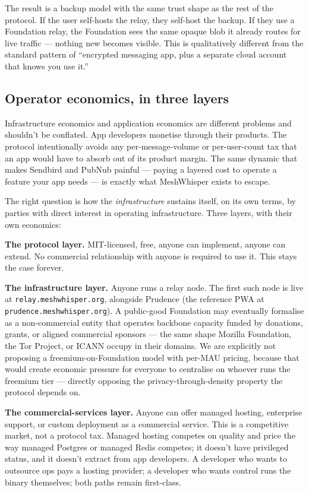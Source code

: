 \documentclass[11pt, a4paper]{article}
\begin{document}
The result is a backup model with the same trust shape as the rest of the protocol. If the user self-hosts the relay, they self-host the backup. If they use a Foundation relay, the Foundation sees the same opaque blob it already routes for live traffic — nothing new becomes visible. This is qualitatively different from the standard pattern of ``encrypted messaging app, plus a separate cloud account that knows you use it.''

\subsection*{Operator economics, in three layers}

Infrastructure economics and application economics are different problems and shouldn't be conflated. App developers monetise through their products. The protocol intentionally avoids any per-message-volume or per-user-count tax that an app would have to absorb out of its product margin. The same dynamic that makes Sendbird and PubNub painful --- paying a layered cost to operate a feature your app needs --- is exactly what MeshWhisper exists to escape.

The right question is how the \emph{infrastructure} sustains itself, on its own terms, by parties with direct interest in operating infrastructure. Three layers, with their own economics:

\textbf{The protocol layer.} MIT-licensed, free, anyone can implement, anyone can extend. No commercial relationship with anyone is required to use it. This stays the case forever.

\textbf{The infrastructure layer.} Anyone runs a relay node. The first such node is live at \texttt{relay.meshwhisper.org}, alongside Prudence (the reference PWA at \texttt{prudence.meshwhisper.org}). A public-good Foundation may eventually formalise as a non-commercial entity that operates backbone capacity funded by donations, grants, or aligned commercial sponsors --- the same shape Mozilla Foundation, the Tor Project, or ICANN occupy in their domains. We are explicitly not proposing a freemium-on-Foundation model with per-MAU pricing, because that would create economic pressure for everyone to centralise on whoever runs the freemium tier --- directly opposing the privacy-through-density property the protocol depends on.

\textbf{The commercial-services layer.} Anyone can offer managed hosting, enterprise support, or custom deployment as a commercial service. This is a competitive market, not a protocol tax. Managed hosting competes on quality and price the way managed Postgres or managed Redis competes; it doesn't have privileged status, and it doesn't extract from app developers. A developer who wants to outsource ops pays a hosting provider; a developer who wants control runs the binary themselves; both paths remain first-class.
\end{document}
